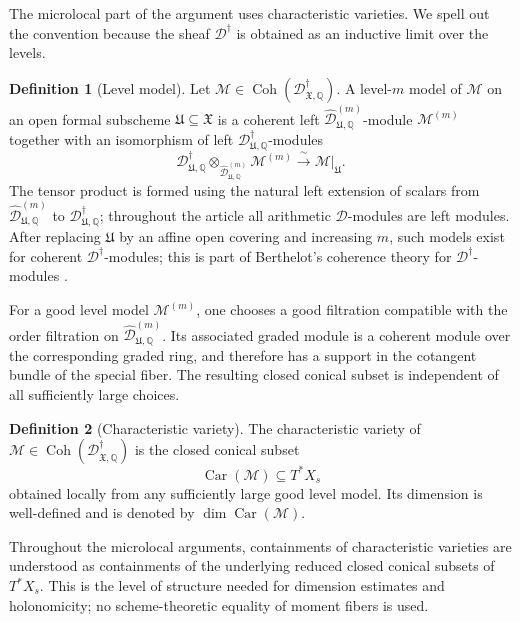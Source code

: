 \documentclass[11pt]{amsart}
\theoremstyle{plain}
\theoremstyle{definition}
\newtheorem{definition}{Definition}[section]
\theoremstyle{remark}
\newcommand{\Coh}{\operatorname{Coh}}
\newcommand{\Car}{\operatorname{Car}}
\begin{document}
The microlocal part of the argument uses characteristic varieties. We spell out
the convention because the sheaf \(\mathscr D^\dagger\) is obtained as an
inductive limit over the levels.

\begin{definition}[Level model]
\label{def:level-model}
Let \(\mathcal M\in\Coh(\mathscr D^\dagger_{\mathfrak X,\mathbb Q})\). A
level-\(m\) model of \(\mathcal M\) on an open formal subscheme
\(\mathfrak U\subseteq\mathfrak X\) is a coherent left
\(\widehat{\mathscr D}^{(m)}_{\mathfrak U,\mathbb Q}\)-module
\(\mathcal M^{(m)}\) together with an isomorphism of left
\(\mathscr D^\dagger_{\mathfrak U,\mathbb Q}\)-modules
\[
  \mathscr D^\dagger_{\mathfrak U,\mathbb Q}
  \otimes_{\widehat{\mathscr D}^{(m)}_{\mathfrak U,\mathbb Q}}
  \mathcal M^{(m)}
  \xrightarrow{\;\sim\;}
  \mathcal M|_{\mathfrak U}.
\]
The tensor product is formed using the natural left extension of scalars from
\(\widehat{\mathscr D}^{(m)}_{\mathfrak U,\mathbb Q}\) to
\(\mathscr D^\dagger_{\mathfrak U,\mathbb Q}\); throughout the article all
arithmetic \(\mathscr D\)-modules are left modules.  After replacing
\(\mathfrak U\) by an affine open covering and increasing \(m\), such models
exist for coherent \(\mathscr D^\dagger\)-modules; this is part of Berthelot's
coherence theory for \(\mathscr D^\dagger\)-modules
\cite[5.3.2--5.3.4]{BerthelotIntro}.
\end{definition}

For a good level model \(\mathcal M^{(m)}\), one chooses a good filtration
compatible with the order filtration on
\(\widehat{\mathscr D}^{(m)}_{\mathfrak U,\mathbb Q}\). Its associated graded
module is a coherent module over the corresponding graded ring, and therefore
has a support in the cotangent bundle of the special fiber. The resulting
closed conical subset is independent of all sufficiently large choices.

\begin{definition}[Characteristic variety]
\label{def:characteristic-variety}
The characteristic variety of
\(\mathcal M\in\Coh(\mathscr D^\dagger_{\mathfrak X,\mathbb Q})\) is the
closed conical subset
\[
  \Car(\mathcal M)\subseteq T^*X_s
\]
obtained locally from any sufficiently large good level model. Its dimension is
well-defined and is denoted by \(\dim\Car(\mathcal M)\).
\end{definition}

Throughout the microlocal arguments, containments of characteristic varieties
are understood as containments of the underlying reduced closed conical subsets
of \(T^*X_s\).  This is the level of structure needed for dimension estimates
and holonomicity; no scheme-theoretic equality of moment fibers is used.
\end{document}
